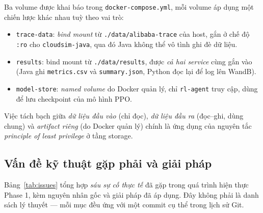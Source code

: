 Ba volume được khai báo trong \texttt{docker-compose.yml}, mỗi
volume áp dụng một chiến lược khác nhau tuỳ theo vai trò:
\begin{itemize}
  \item \texttt{trace-data}: \emph{bind mount} từ
        \texttt{./data/alibaba-trace} của host, gắn ở chế độ
        \texttt{:ro} cho \texttt{cloudsim-java}, qua đó Java
        không thể vô tình ghi đè dữ liệu.
  \item \texttt{results}: bind mount từ \texttt{./data/results},
        được \emph{cả hai service} cùng gắn vào (Java ghi
        \texttt{metrics.csv} và \texttt{summary.json}, Python đọc
        lại để log lên WandB).
  \item \texttt{model-store}: \emph{named volume} do Docker quản
        lý, chỉ \texttt{rl-agent} truy cập, dùng để lưu checkpoint
        của mô hình PPO.
\end{itemize}
Việc tách bạch giữa \emph{dữ liệu đầu vào} (chỉ đọc), \emph{dữ liệu
đầu ra} (đọc--ghi, dùng chung) và \emph{artifact riêng} (do Docker
quản lý) chính là ứng dụng của nguyên tắc \textit{principle of
least privilege} ở tầng storage.

\subsection{Vấn đề kỹ thuật gặp phải và giải pháp}
\label{ssec:impl-issues}

Bảng~\ref{tab:issues} tổng hợp \emph{sáu sự cố thực tế} đã gặp
trong quá trình hiện thực Phase 1, kèm nguyên nhân gốc và giải
pháp đã áp dụng. Đây không phải là danh sách lý thuyết --- mỗi
mục đều ứng với một commit cụ thể trong lịch sử Git.

